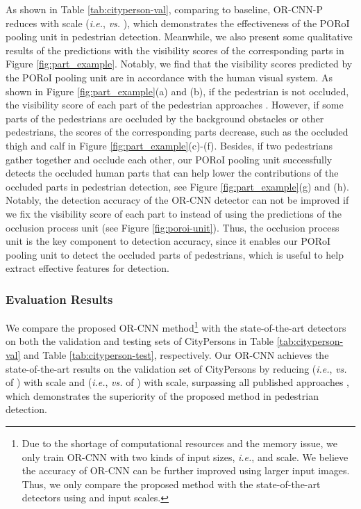 \documentclass[runningheads]{llncs}
\def\ie{{\em i.e.}}
\begin{document}
As shown in Table \ref{tab:cityperson-val}, comparing to baseline, OR-CNN-P reduces   with  scale (\ie,  {\em vs.} ), which demonstrates the effectiveness of the PORoI pooling unit in pedestrian detection. Meanwhile, we also present some qualitative results of the predictions with the visibility scores of the corresponding parts in Figure \ref{fig:part_example}. Notably, we find that the visibility scores predicted by the PORoI pooling unit are in accordance with the human visual system. As shown in Figure \ref{fig:part_example}(a) and (b), if the pedestrian is not occluded, the visibility score of each part of the pedestrian approaches . However, if some parts of the pedestrians are occluded by the background obstacles or other pedestrians, the scores of the corresponding parts decrease, such as the occluded thigh and calf in Figure \ref{fig:part_example}(c)-(f). Besides, if two pedestrians gather together and occlude each other, our PORoI pooling unit successfully detects the occluded human parts that can help lower the contributions of the occluded parts in pedestrian detection, see Figure \ref{fig:part_example}(g) and (h). Notably, the detection accuracy of the OR-CNN detector can not be improved if we fix the visibility score of each part to  instead of using the predictions of the occlusion process unit (see Figure \ref{fig:poroi-unit}). Thus, the occlusion process unit is the key component to detection accuracy, since it enables our PORoI pooling unit to detect the occluded parts of pedestrians, which is useful to help extract effective features for detection.


\subsubsection{Evaluation Results}
We compare the proposed OR-CNN method\footnote{Due to the shortage of computational resources and the memory issue, we only train OR-CNN with two kinds of input sizes, \ie,  and  scale. We believe the accuracy of OR-CNN can be further improved using larger input images. Thus, we only compare the proposed method with the state-of-the-art detectors using  and  input scales.} with the state-of-the-art detectors \cite{DBLP:journals/corr/abs-1711-07752,DBLP:conf/cvpr/ZhangBS17} on both the validation and testing sets of CityPersons in Table \ref{tab:cityperson-val} and Table \ref{tab:cityperson-test}, respectively. Our OR-CNN achieves the state-of-the-art results on the validation set of CityPersons by reducing   (\ie,  {\em vs.}  of \cite{DBLP:journals/corr/abs-1711-07752}) with  scale and   (\ie,  {\em vs.}  of \cite{DBLP:journals/corr/abs-1711-07752}) with  scale, surpassing all published approaches \cite{DBLP:journals/corr/abs-1711-07752,DBLP:conf/cvpr/ZhangBS17}, which demonstrates the superiority of the proposed method in pedestrian detection.
\end{document}

